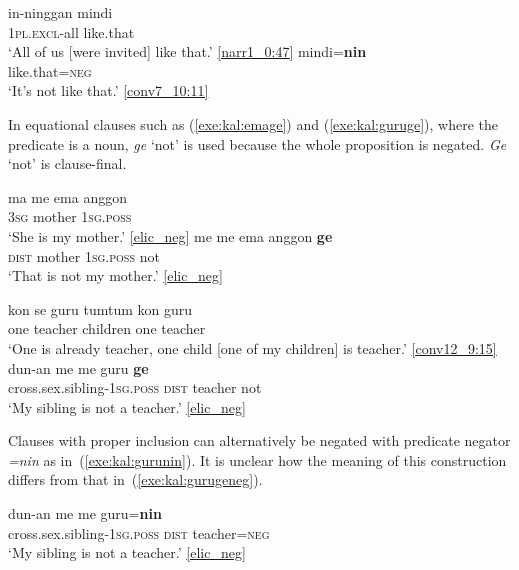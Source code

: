 \documentclass[output=paper,colorlinks,citecolor=brown,draft]{langscibook}
\begin{document}
\ea \label{exe:kal:mindinin}
\ea \gll in-ninggan mindi\\
\textsc{1pl.excl}-all like.that\\
\glt `All of us [were invited] like that.' {\href{http://hdl.handle.net/10050/00-0000-0000-0004-1BD8-4}{[narr1\_0:47]}}
\ex \gll mindi=\textbf{nin}\\
like.that=\textsc{neg}\\
\glt `It's not like that.' {\href{http://hdl.handle.net/10050/00-0000-0000-0004-1BC3-B}{[conv7\_10:11]}}
\z  \z

In equational clauses such as (\ref{exe:kal:emage}) and (\ref{exe:kal:guruge}), where the predicate is a noun, \textit{ge} `not' is used because the whole proposition is negated. \textit{Ge} `not' is clause-final.

\ea 	\label{exe:kal:emage}
\ea \gll ma me ema anggon\\
\textsc{3sg} {\glme} mother \textsc{1sg.poss}\\
\glt `She is my mother.'  {\href{http://hdl.handle.net/10050/00-0000-0000-0004-1C60-A}{[elic\_neg]}}
\ex \gll me me ema anggon \textbf{ge}\\
\textsc{dist} {\glme} mother \textsc{1sg.poss} not\\
\glt `That is not my mother.' {\href{http://hdl.handle.net/10050/00-0000-0000-0004-1C60-A}{[elic\_neg]}}
\z \z 

\ea 	\label{exe:kal:guruge}
\ea \gll kon se guru tumtum kon guru\\
	one {\glse} teacher children one teacher\\
\glt `One is already teacher, one child [one of my children] is teacher.' {\href{http://hdl.handle.net/10050/00-0000-0000-0004-1BBD-5}{[conv12\_9:15]}}
\ex \label{exe:kal:gurugeneg} \gll dun-an me me guru \textbf{ge}\\
cross.sex.sibling-\textsc{1sg.poss} \textsc{dist} {\glme} teacher not\\
\glt `My sibling is not a teacher.' {\href{http://hdl.handle.net/10050/00-0000-0000-0004-1C60-A}{[elic\_neg]}}
\z \z

Clauses with proper inclusion can alternatively be negated with predicate negator \textit{=nin} as in~(\ref{exe:kal:gurunin}). It is unclear how the meaning of this construction differs from that in~(\ref{exe:kal:gurugeneg}).

\ea 	\label{exe:kal:gurunin}
\gll dun-an me me guru=\textbf{nin}\\
cross.sex.sibling-\textsc{1sg.poss} \textsc{dist} {\glme} teacher=\textsc{neg}\\
\glt `My sibling is not a teacher.' {\href{http://hdl.handle.net/10050/00-0000-0000-0004-1C60-A}{[elic\_neg]}}
\z 
\end{document}
